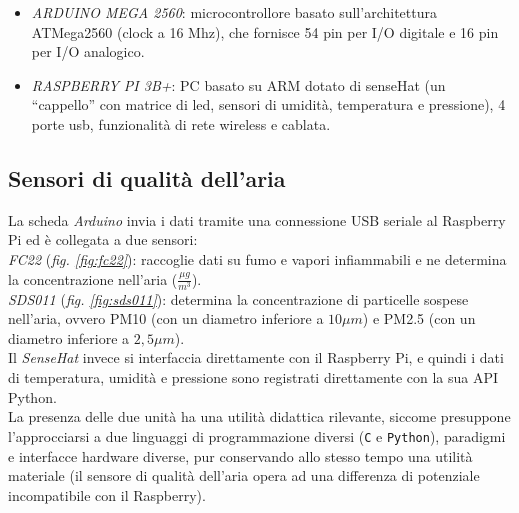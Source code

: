 \documentclass[12pt, a4paper]{article}
\begin{document}
	\begin{itemize}
		\item \emph{ARDUINO MEGA 2560}: microcontrollore basato sull'architettura ATMega2560 (clock a 16 Mhz), che fornisce 54 pin per I/O digitale e 16 pin per I/O analogico.\\ 
		\item \emph{RASPBERRY PI 3B+}: PC basato su ARM dotato di senseHat (un ``cappello'' con matrice di led, sensori di umidità, temperatura e pressione), 4 porte usb, funzionalità di rete wireless e cablata.
	\end{itemize}
	
	\subsection{Sensori di qualità dell'aria}
	La scheda \emph{Arduino} invia i dati tramite una connessione USB seriale al Raspberry Pi ed è collegata a due sensori:\\
	\emph{FC22} (\emph{fig. \ref{fig:fc22}}): raccoglie dati su fumo e vapori infiammabili e ne determina la concentrazione nell'aria ($\frac{\mu g}{m^3}$).\\
	\emph{SDS011} (\emph{fig. \ref{fig:sds011}}): determina la concentrazione di particelle sospese nell'aria, ovvero PM10 (con un diametro inferiore a $10\mu m$) e PM2.5 (con un diametro inferiore a $2,5 \mu m$).\\
	Il \emph{SenseHat} invece si interfaccia direttamente con il Raspberry Pi, e quindi i dati di temperatura, umidità e pressione sono registrati direttamente con la sua API Python.\\
	La presenza delle due unità ha una utilità didattica rilevante, siccome presuppone l'approcciarsi a due linguaggi di programmazione diversi (\texttt{C} e \texttt{Python}), paradigmi e interfacce hardware diverse, pur conservando allo stesso tempo una utilità materiale (il sensore di qualità dell'aria opera ad una differenza di potenziale incompatibile con il Raspberry).
\end{document}
